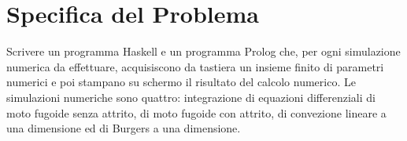 \section{Specifica del Problema}

Scrivere un programma Haskell e un programma Prolog che, per ogni simulazione numerica da effettuare, acquisiscono da tastiera un insieme finito di parametri numerici e poi stampano su schermo il risultato del calcolo numerico. Le simulazioni numeriche sono quattro: integrazione di equazioni differenziali di moto fugoide senza attrito, di moto fugoide con attrito, di convezione lineare a una dimensione ed di Burgers a una dimensione.
